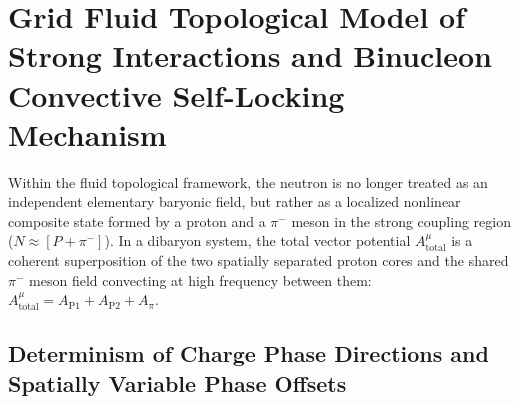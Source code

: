 \documentclass[12pt, a4paper]{article}
\begin{document}
\section{Grid Fluid Topological Model of Strong Interactions and Binucleon Convective Self-Locking Mechanism}

Within the fluid topological framework, the neutron is no longer treated as an independent elementary baryonic field, but rather as a localized nonlinear composite state formed by a proton and a $\pi^-$ meson in the strong coupling region ($N \approx [P + \pi^-]$). In a dibaryon system, the total vector potential $A^\mu_{\mathrm{total}}$ is a coherent superposition of the two spatially separated proton cores and the shared $\pi^-$ meson field convecting at high frequency between them: $A^\mu_{\mathrm{total}} = A_{\mathrm{P1}} + A_{\mathrm{P2}} + A_\pi$.

\subsection{Determinism of Charge Phase Directions and Spatially Variable Phase Offsets}
\end{document}
